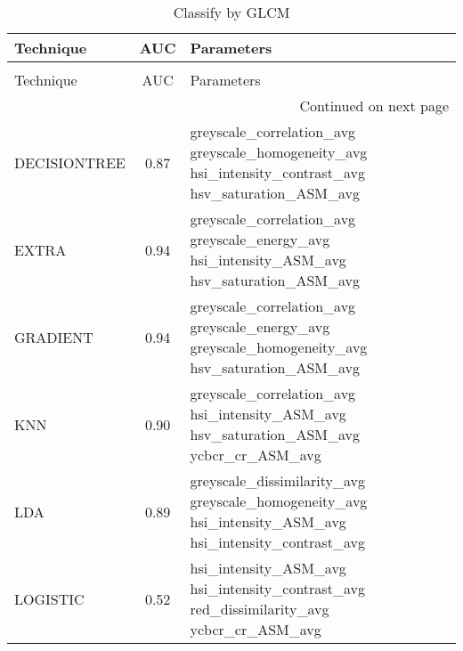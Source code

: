 \begin{longtable}{lcl}
\caption[Classify by GLCM]{Classify by GLCM}
\label{table:results-glcm}\\
\toprule
   Technique &  AUC &                                                                                             Parameters \\
\midrule
\endfirsthead
\caption[]{Classify by GLCM} \\
\toprule
   Technique &  AUC &                                                                                             Parameters \\
\midrule
\endhead
\midrule
\multicolumn{3}{r}{{Continued on next page}} \\
\midrule
\endfoot

\bottomrule
\endlastfoot
DECISIONTREE & 0.87 &  \begin{minipage}[t]{0.5\textwidth} greyscale\_correlation\_avg greyscale\_homogeneity\_avg hsi\_intensity\_contrast\_avg hsv\_saturation\_ASM\_avg \end{minipage}\\
\midrule
EXTRA & 0.94 & \begin{minipage}[t]{0.5\textwidth} greyscale\_correlation\_avg greyscale\_energy\_avg hsi\_intensity\_ASM\_avg hsv\_saturation\_ASM\_avg \end{minipage}\\
\midrule
GRADIENT & 0.94 & \begin{minipage}[t]{0.5\textwidth} greyscale\_correlation\_avg greyscale\_energy\_avg greyscale\_homogeneity\_avg hsv\_saturation\_ASM\_avg \end{minipage}\\
\midrule
KNN & 0.90 &  \begin{minipage}[t]{0.5\textwidth} greyscale\_correlation\_avg hsi\_intensity\_ASM\_avg hsv\_saturation\_ASM\_avg ycbcr\_cr\_ASM\_avg \end{minipage}\\
\midrule
LDA & 0.89 & \begin{minipage}[t]{0.5\textwidth}greyscale\_dissimilarity\_avg greyscale\_homogeneity\_avg hsi\_intensity\_ASM\_avg hsi\_intensity\_contrast\_avg \end{minipage}\\
\midrule
LOGISTIC & 0.52 & \begin{minipage}[t]{0.5\textwidth} hsi\_intensity\_ASM\_avg hsi\_intensity\_contrast\_avg red\_dissimilarity\_avg ycbcr\_cr\_ASM\_avg \end{minipage} \\

\end{longtable}
